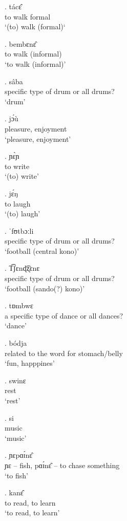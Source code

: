 \documentclass{assets/fieldnotes}
\begin{document}

\exg.  tácɛ̂\\
to walk formal\\
`(to) walk (formal)` 


\exg. bembɛnɛ̂\\ 
to walk (informal)\\
`to walk (informal)'

\exg. sâba\\
specific type of drum or all drums? \\
`drum'

\exg. jɔ́ù\\
pleasure, enjoyment\\
`pleasure, enjoyment'


\exg. ɲɛ̀ɲ\\
to write\\
`(to) write'


\exg. jɛ́ŋ\\
to laugh\\
`(to) laugh'


\exg. ˈfʊtbɔːli\\
specific type of drum or all drums? \\
`football (central kono)'

\exg. T͡ʃɛnɖ͡ʐɛnɛ\\
specific type of drum or all drums? \\
`football (sando(?) kono)'


\exg. tɒmbwɛ\\
a specific type of dance or all dances? \\
`dance'

\exg. bódja\\
related to the word for stomach/belly \\
`fun, happpines'

\exg. swinɛ\\
rest\\
`rest'


\exg. si\\ 
music\\
`music'


\exg. ɲɛpɑɪ́nɛ̂\\
ɲɛ – fish, pɑɪ́nɛ̂ – to chase something \\
`to fish'

\exg. kanɛ̂\\
to read, to learn\\
`to read, to learn'



\newpage 
\end{document}
